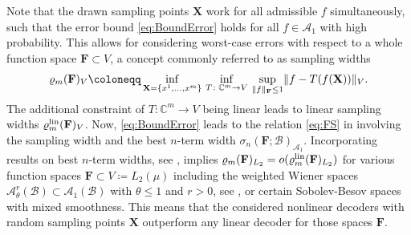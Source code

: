 \documentclass[11pt,reqno, a4paper]{article}
\numberwithin{equation}{section}
\newcommand{\C}{\mathbb{C}}
\begin{document}
Note that the drawn sampling points $\mathbf X$ work for all admissible $f$ simultaneously, such that the error bound \eqref{eq:BoundError} holds for all $f \in \mathcal{A}_1$ with high probability.
This allows for considering worst-case errors with respect to a whole function space $\mathbf{F}\subset V$, a concept commonly referred to as sampling widths
\begin{equation}\label{def:nonlin_sampling_numbers}
	\varrho_m (\mathbf{F})_V \coloneqq
	\inf_{\mathbf{X}= \{x^1, \dots, x^{m}\}}\,
	\inf_{T\colon \mathbb{C}^m \to V}\,
	\sup\limits_{\smash{\lVert f \rVert_{\mathbf{F}} \leq 1}} \lVert f - T(f(\mathbf{X})) \rVert_{V}. 
\end{equation}
The additional constraint of $T\colon \C^{m} \to V$ being linear leads to linear sampling widths $\varrho^{\rm lin}_m (\mathbf{F})_V$.
Now, \eqref{eq:BoundError} leads to the relation \eqref{eq:FS} in  involving the sampling width and the best $n$-term width $\sigma_n(\mathbf{F};\mathcal{B})_{\mathcal{A}_1}$.
Incorporating results on best $n$-term widths, see \cite{DTU18,MPU25_1}, implies $\varrho_m (\mathbf{F})_{L_2} = o(\varrho^{\rm lin}_m (\mathbf{F})_{L_2})$
for various function spaces $\mathbf F \subset V\coloneqq L_2(\mu)$ including the weighted Wiener spaces $\mathcal{A}^r_\theta(\mathcal{B}) \subset \mathcal{A}_1(\mathcal{B})$ with $\theta\leq 1$ and $r>0$, see \cite{JUV23, MSU25}, or certain Sobolev-Besov spaces with mixed smoothness.
This means that the considered nonlinear decoders with random sampling points $\mathbf X$ outperform any linear decoder for those spaces $\mathbf{F}$.
\end{document}
